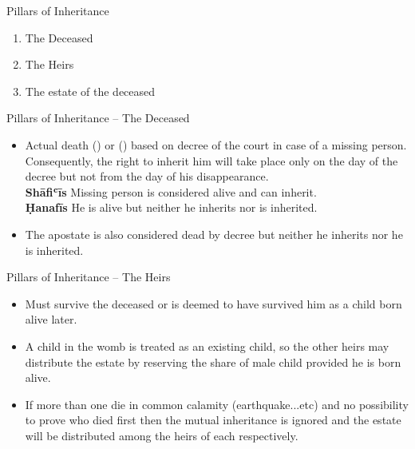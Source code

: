 \begin{frame}{Pillars of Inheritance}
\begin{enumerate}
\item {} The Deceased
\item {} The Heirs
\item {} The estate of the deceased
\end{enumerate}
\end{frame}

\begin{frame}{Pillars of Inheritance -- The Deceased \hfill {}}
\begin{itemize}
\item Actual death () or () based on decree of the court in case of a missing person. Consequently, the right to inherit him will take place only on the day of the decree but not from the day of his disappearance.\\
\textbf{Shāfiʿīs} Missing person is considered alive and can inherit.\\
\textbf{Ḥanafīs} He is alive but neither he inherits nor is inherited.\\
\item The apostate is also considered dead by decree but neither he inherits nor he is inherited.
\end{itemize}
\end{frame}

\begin{frame}{Pillars of Inheritance -- The Heirs \hfill {}}
\begin{itemize}
\item Must survive the deceased or is deemed to have survived him as a child born alive later.
\item A child in the womb is treated as an existing child, so the other heirs may distribute the estate by reserving the share of male child provided he is born alive.
\item If more than one die in common calamity (earthquake...etc) and no possibility to prove who died first then the mutual inheritance is ignored and the estate will be distributed among the heirs of each respectively.
\end{itemize}
\end{frame}

